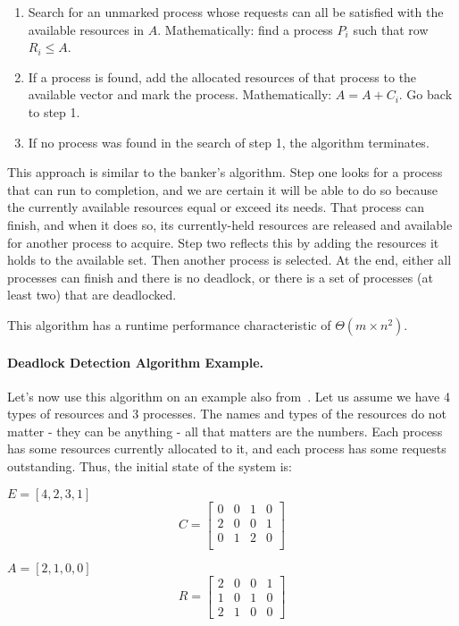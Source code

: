 \begin{enumerate}
	\item Search for an unmarked process whose requests can all be satisfied with the available resources in $A$. Mathematically: find a process $P_{i}$ such that row $R_{i} \leq A$.
	\item If a process is found, add the allocated resources of that process to the available vector and mark the process. Mathematically: $A = A + C_{i}$. Go back to step 1.
	\item If no process was found in the search of step 1, the algorithm terminates.
\end{enumerate}

This approach is similar to the banker's algorithm. Step one looks for a process that can run to completion, and we are certain it will be able to do so because the currently available resources equal or exceed its needs. That process can finish, and when it does so, its currently-held resources are released and available for another process to acquire. Step two reflects this by adding the resources it holds to the available set. Then another process is selected. At the end, either all processes can finish and there is no deadlock, or there is a set of processes (at least two) that are deadlocked.

This algorithm has a runtime performance characteristic of $\Theta(m \times n^{2})$.

\paragraph{Deadlock Detection Algorithm Example.}

Let's now use this algorithm on an example also from~\cite{mos}. Let us assume we have 4 types of resources and 3 processes. The names and types of the resources do not matter - they can be anything - all that matters are the numbers. Each process has some resources currently allocated to it, and each process has some requests outstanding. Thus, the initial state of the system is:

\begin{multicols}{2}
	\begin{center}
		$E = [4, 2, 3, 1]$
		\[ C =
			\left[ {\begin{array}{cccc}
							0 & 0 & 1 & 0 \\
							2 & 0 & 0 & 1 \\
							0 & 1 & 2 & 0 \\
						\end{array} } \right]
		\]
	\end{center}
	\columnbreak

	\begin{center}
		$A = [2, 1, 0, 0]$
		\[ R =
			\left[ {\begin{array}{cccc}
							2 & 0 & 0 & 1 \\
							1 & 0 & 1 & 0 \\
							2 & 1 & 0 & 0
						\end{array} } \right]
		\]
	\end{center}

\end{multicols}

